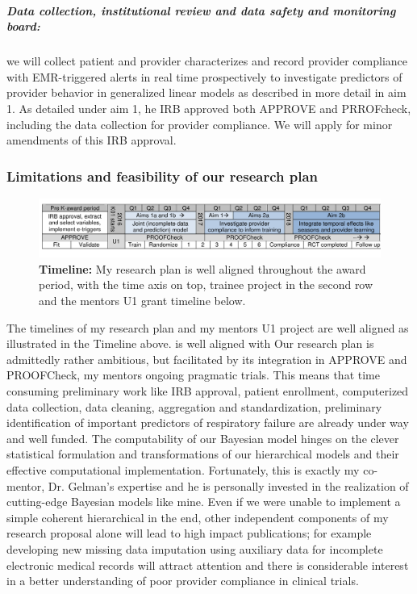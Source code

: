 \documentclass[11pt,notitlepage]{article}
\begin{document}
\subparagraph*{Data collection, institutional review and data safety and monitoring board:} we will collect patient and provider characterizes and record provider compliance with EMR-triggered alerts in real time prospectively to investigate predictors of provider behavior in generalized linear models as described in more detail in aim 1. As detailed under aim 1, he IRB approved both APPROVE and PRROFcheck, including the data collection for provider compliance. We will apply for minor amendments of this IRB approval.
 
\subsubsection*{Limitations and feasibility of our research plan }

\begin{figure}[h]
 \vspace{-20pt}
 \centering
   \includegraphics[scale=1]{Figures/Timeline.pdf}  
 \vspace{-30pt}
 \caption*{\footnotesize \textbf{Timeline:} My research plan is well aligned throughout the award period, with the time axis on top, trainee project in the second row and the mentors U1 grant timeline below. }
  \vspace{-10pt}
  \label{fig:Timeline}
 \end{figure}
 
The timelines of my research plan and my mentors U1 project are well aligned as illustrated in the Timeline above. is well aligned with Our research plan is admittedly rather ambitious, but facilitated by its integration in APPROVE and PROOFCheck, my mentors ongoing pragmatic trials. This means that time consuming preliminary work like IRB approval, patient enrollment, computerized data collection, data cleaning, aggregation and standardization, preliminary identification of important predictors of respiratory failure are already under way and well funded. The computability of our Bayesian model hinges on the clever statistical formulation and transformations of our hierarchical models and their effective computational implementation. Fortunately, this is exactly my co-mentor, Dr. Gelman's expertise and he is personally invested in the realization of cutting-edge Bayesian models like mine. Even if we were unable to implement a simple coherent hierarchical in the end, other independent components of my research proposal alone will lead to high impact publications; for example developing new missing data imputation using auxiliary data for incomplete electronic medical records will attract attention and there is considerable interest in a better understanding of poor provider compliance in clinical trials. 
\end{document}
